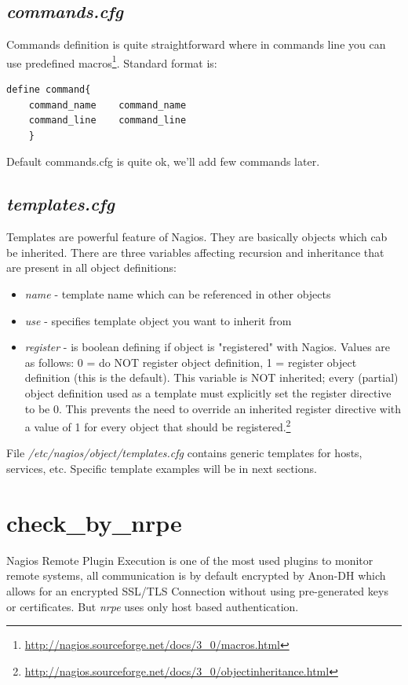 \documentclass[10pt,a4paper,final]{report}
\begin{document}
\subsection{\emph{commands.cfg}}
Commands definition is quite straightforward where in commands line you can use predefined macros\footnote{\url{http://nagios.sourceforge.net/docs/3\_0/macros.html}}. Standard format is:
\begin{lstlisting}
define command{
	command_name	command_name
	command_line	command_line
   	}
\end{lstlisting}
Default commands.cfg is quite ok, we'll add few commands later.

\subsection{\emph{templates.cfg}}
Templates are powerful feature of Nagios. They are basically objects which cab be inherited. There are three variables affecting recursion and inheritance that are present in all object definitions:
\begin{itemize}
\item \emph{name} - template name which can be referenced in other objects
\item \emph{use} - specifies template object you want to inherit from
\item \emph{register} - is boolean defining if object is "registered" with Nagios. Values are as follows: 0 = do NOT register object definition, 1 = register object definition (this is the default). This variable is NOT inherited; every (partial) object definition used as a template must explicitly set the register directive to be 0. This prevents the need to override an inherited register directive with a value of 1 for every object that should be registered.\footnote{\url{http://nagios.sourceforge.net/docs/3\_0/objectinheritance.html}}
\end{itemize}
File \emph{/etc/nagios/object/templates.cfg} contains generic templates for hosts, services, etc. Specific template examples will be in next sections.

\section{check\_by\_nrpe}
Nagios Remote Plugin Execution is one of the most used plugins to monitor remote systems, all communication is by default encrypted by Anon-DH which allows for an encrypted SSL/TLS Connection without using pre-generated keys or certificates. But \emph{nrpe} uses only host based authentication.
\end{document}
